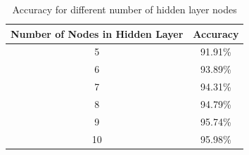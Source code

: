 \documentclass{article}
\begin{document}
\begin{table}[H]
	\begin{tabular}{|c|c|} \hline
		Number of Nodes in Hidden Layer & Accuracy \\ \hline
		5                               & 91.91\%  \\ \hline
		6                               & 93.89\%  \\ \hline
		7                               & 94.31\%  \\ \hline
		8                               & 94.79\%  \\ \hline
		9                               & 95.74\%  \\ \hline
		10                              & 95.98\%  \\ \hline
	\end{tabular}
	\caption{Accuracy for different number of hidden layer nodes}
\end{table}
\end{document}

